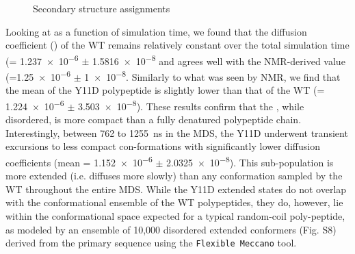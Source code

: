 \begin{figure}
	\centering     %
	\caption{Secondary structure assignments}
\end{figure}

Looking at \diffusion{} as a function of simulation time, we found that the diffusion coefficient (\diffusion) of the WT \gct{} remains relatively constant over the total simulation time (\diffusion = \num{1.237e-6} $\pm$ \SI{1.5816e-8}{\dcunits} and agrees well with the NMR-derived value (\diffusion=\num{1.25e-6} $\pm$  \SI{1e-8}{\dcunits}.  Similarly to what was seen by NMR, we find that the mean \diffusion of the Y11D \gct{} polypeptide is slightly lower than that of the WT \gct{} (\diffusion= \num{1.224e-6} $\pm$ \SI{3.503e-8}{\dcunits}). These results confirm that the \gct{}, while disordered, is more compact than a fully denatured polypeptide chain. Interestingly, between \num{762} to \SI{1255}{\ns} in the MDS, the Y11D \gct{} underwent transient excursions to less compact con-formations with significantly lower diffusion coefficients (mean \diffusion{}= \num{1.152e-6} $\pm$ \SI{2.0325e-8}{\dcunits}). This sub-population is more extended (i.e. diffuses more slowly) than any conformation sampled by the WT \gct{} throughout the entire MDS. While the Y11D \gct{} extended states do not overlap with the conformational ensemble of the WT \gct{} polypeptides, they do, however, lie within the conformational space expected for a typical random-coil poly-peptide, as modeled by an ensemble of 10,000 disordered extended conformers (Fig. S8) derived from the \gct{} primary sequence using the \texttt{Flexible Meccano} tool. 


